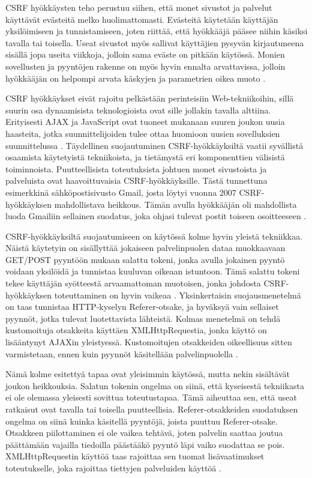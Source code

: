 CSRF hyökkäysten teho perustuu siihen, että monet sivustot ja palvelut
käyttävät evästeitä melko huolimattomasti. Evästeitä käytetään
käyttäjän yksilöimiseen ja tunnistamiseen, joten riittää, että hyökkääjä pääsee niihin käsiksi tavalla tai toisella. Useat sivustot myös sallivat käyttäjien pysyvän kirjautuneena sisällä
jopa useita viikkoja, jolloin sama eväste on pitkään käytössä. Monien sovellusten ja pyyntöjen rakenne on myös hyvin ennalta arvattavissa, jolloin hyökkääjän
on helpompi arvata käskyjen ja parametrien oikea muoto \cite{WEB2}.

CSRF hyökkäykset eivät rajoitu pelkästään perinteisiin Web-tekniikoihin, sillä suurin osa dynaamisista teknologioista ovat sille jollakin 
tavalla alttiina. Erityisesti AJAX ja JavaScript ovat tuoneet mukanaan suuren joukon uusia haasteita, jotka suunnittelijoiden tulee ottaa huomioon uusien
sovelluksien suunnittelussa \cite{WEB2b}. Täydellinen suojautuminen CSRF-\-hyökkäyksiltä vaatii syvällistä osaamista käytetyistä tekniikoista, ja 
tietämystä eri komponenttien välisistä toiminnoista. Puutteellisista
toteutuksista johtuen monet sivustoista ja palveluista ovat haavoittuvaisia
CSRF-hyökkäyksille. Tästä tunnettuna esimerkkinä sähköpostisivusto Gmail, josta löytyi vuonna 2007 CSRF-hyökkäyksen mahdollistava heikkous. Tämän avulla
hyökkääjän oli mahdollista luoda Gmailiin sellainen suodatus, joka ohjasi tulevat postit toiseen osoitteeseen \cite{CSRF}. 

CSRF-hyökkäyksiltä suojautumiseen on käytössä kolme hyvin yleistä tekniikkaa. Näistä käytetyin on sisällyttää jokaiseen palvelinpuolen dataa muokkaavaan
GET/POST pyyntöön mukaan salattu tokeni, jonka avulla jokainen pyyntö voidaan yksilöidä ja tunnistaa kuuluvan oikeaan istuntoon. Tämä salattu tokeni tekee
käyttäjän syötteestä arvaamattoman muotoisen, jonka johdosta CSRF-hyökkäyksen toteuttaminen on hyvin vaikeaa \cite{WEB2}. Yksinkertaisin suojausmenetelmä on 
taas tunnistaa HTTP-kyselyn Referer-otsake, ja hyväksyä vain sellaiset pyynnöt, jotka tulevat luotettavista lähteistä. Kolmas menetelmä on tehdä kustomoituja
otsakkeita käyttäen XMLHttpRequestia, jonka käyttö on lisääntynyt AJAXin yleistyessä. Kustomoitujen otsakkeiden oikeellisuus sitten varmistetaan, ennen kuin
pyynnöt käsitellään palvelinpuolella \cite{CSRF}.

Nämä kolme esitettyä tapaa ovat yleisimmin käytössä, mutta nekin sisältävät joukon heikkouksia. Salatun tokenin ongelma on siinä, että kyseisestä tekniikasta ei 
ole olemassa yleisesti sovittua toteutustapaa. Tämä aiheuttaa sen, että useat ratkaisut ovat tavalla tai toisella puutteellisia. Referer-otsakkeiden suodatuksen 
ongelma on siinä kuinka käsitellä pyyntöjä, joista puuttuu Referer-otsake. Otsakkeen piilottaminen ei ole vaikea tehtävä, joten palvelin saattaa joutua 
päättämään vajailla tiedoilla päästääkö pyyntö läpi vaiko suodattaa se pois. XMLHttpRequestin käyttöä taas rajoittaa sen tuomat lisävaatimukset toteutukselle,
joka rajoittaa tiettyjen palveluiden käyttöä \cite{CSRF}. 


